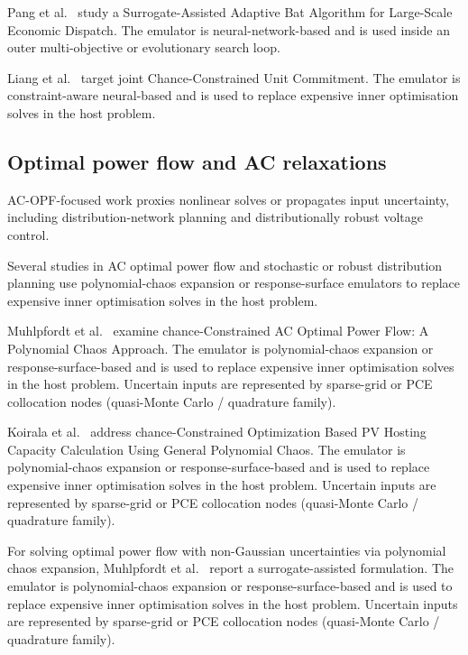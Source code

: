 Pang et al.~\cite{Pang2023} study a Surrogate-Assisted Adaptive Bat Algorithm for Large-Scale Economic Dispatch. The emulator is neural-network-based and is used inside an outer multi-objective or evolutionary search loop.

Liang et al.~\cite{Liang20246508} target joint Chance-Constrained Unit Commitment. The emulator is constraint-aware neural-based and is used to replace expensive inner optimisation solves in the host problem.

\subsection{Optimal power flow and AC relaxations}
\label{sec:apps:opf}

AC-OPF-focused work proxies nonlinear solves or propagates input uncertainty, including distribution-network planning and distributionally robust voltage control.

Several studies in AC optimal power flow and stochastic or robust distribution planning use polynomial-chaos expansion or response-surface emulators to replace expensive inner optimisation solves in the host problem.

Muhlpfordt et al.~\cite{Muhlpfordt20194806} examine chance-Constrained AC Optimal Power Flow: A Polynomial Chaos Approach. The emulator is polynomial-chaos expansion or response-surface-based and is used to replace expensive inner optimisation solves in the host problem. Uncertain inputs are represented by sparse-grid or PCE collocation nodes (quasi-Monte Carlo / quadrature family).

Koirala et al.~\cite{Koirala20242284} address chance-Constrained Optimization Based PV Hosting Capacity Calculation Using General Polynomial Chaos. The emulator is polynomial-chaos expansion or response-surface-based and is used to replace expensive inner optimisation solves in the host problem. Uncertain inputs are represented by sparse-grid or PCE collocation nodes (quasi-Monte Carlo / quadrature family).

For solving optimal power flow with non-Gaussian uncertainties via polynomial chaos expansion, Muhlpfordt et al.~\cite{Muhlpfordt20174490} report a surrogate-assisted formulation. The emulator is polynomial-chaos expansion or response-surface-based and is used to replace expensive inner optimisation solves in the host problem. Uncertain inputs are represented by sparse-grid or PCE collocation nodes (quasi-Monte Carlo / quadrature family).

